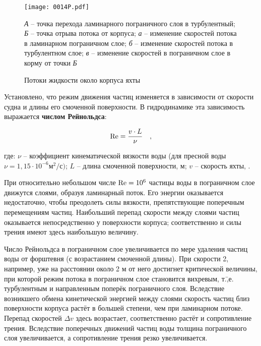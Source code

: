\begin{figure*}[htb]
  \centering
  \texttt{[image: 0014P.pdf]}
  \caption{Потоки жидкости около корпуса яхты}
  \label{fig:14}
  \small
  \centering{}
  \textit{А} \--- точка перехода ламинарного пограничного слоя в турбулентный; \textit{Б} \--- точка отрыва потока от корпуса; \textit{а} \--- изменение скоростей потока в ламинарном пограничном слое; \textit{б} \--- изменение скоростей потока в турбулентном слое; \textit{в} \--- изменение скоростей в пограничном слое в корму от точки \textit{Б}
\end{figure*}

Установлено, что режим движения частиц изменяется в зависимости от
скорости судна и длины его смоченной поверхности. В гидродинамике эта
зависимость выражается \textbf{числом
Рейнольдса}:

\begin{equation}
  \mathrm {Re} = \frac{v \cdot L}{\nu} \quad , 
\end{equation}

где: $\nu$ \--- коэффициент кинематической вязкости воды (для пресной
воды $\nu = 1,15 \cdot 10^{-6} \text{м}^2/\text{с})$; $L$ \--- длина
смоченной поверхности, м; $v$ \--- скорость яхты, \speedms.

При относительно небольшом числе $\mathrm {Re} = 10^6$ частицы воды в
пограничном слое движутся слоями, образуя ламинарный поток. Его
энергии оказывается недостаточно, чтобы преодолеть силы вязкости,
препятствующие поперечным перемещениям частиц. Наибольший перепад
скорости между слоями частиц оказывается непосредственно у поверхности
корпуса; соответственно и силы трения имеют здесь наибольшую величину.

Число Рейнольдса в пограничном слое увеличивается по мере удаления
частиц воды от форштевня (с возрастанием смоченной длины). При
скорости 2\speedms, например, уже на расстоянии около 2 м от него
\Renum достигнет критической величины, при которой режим потока в
пограничном слое становится вихревым, т.\=,е. турбулентным и
направленным поперёк пограничного слоя. Вследствие возникшего обмена
кинетической энергией между слоями скорость частиц близ поверхности
корпуса растёт в большей степени, чем при ламинарном потоке. Перепад
скоростей $\Delta v$ здесь возрастает, соответственно растёт и
сопротивление трения. Вследствие поперечных движений частиц воды
толщина пограничного слоя увеличивается, а сопротивление трения резко
увеличивается.

